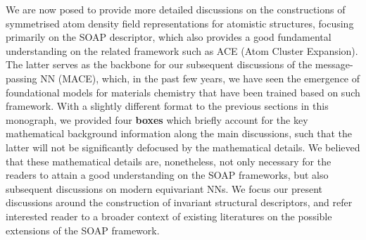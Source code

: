 We are now posed to provide more detailed discussions on the constructions of symmetrised atom density field representations for atomistic structures, focusing primarily on the SOAP descriptor,\cite{bartok2013representing} which also provides a good fundamental understanding on the related framework such as ACE (Atom Cluster Expansion).\cite{drautz2019atomic} The latter serves as the backbone for our subsequent discussions of  the message-passing NN (MACE),\cite{batatia2022mace,batatia2025design}  which, in the past few years, we have seen the emergence of foundational models\cite{batatia2023foundation} for materials chemistry that have been trained based on such framework.  With a slightly different format to the previous sections in this monograph, we provided four \textbf{boxes} which briefly account for the key mathematical background information along the main discussions, such that the latter will not be significantly defocused by the mathematical details. We believed that these mathematical details are, nonetheless, not only necessary for the readers to attain a good understanding on the SOAP frameworks, but also subsequent discussions on modern equivariant NNs. We focus our present discussions around the construction of invariant structural descriptors, and refer interested reader to a broader context of existing literatures on the possible extensions of the SOAP framework.\cite{de2016comparing,willatt2018feature,grisafi2018symmetry,grisafi2019incorporating} 


